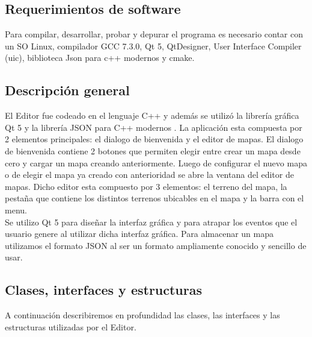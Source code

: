 \documentclass[titlepage,a4paper,12pt]{article}
\begin{document}
\subsection{Requerimientos de software}
Para compilar, desarrollar, probar y depurar el programa es necesario contar con un SO Linux, compilador GCC 7.3.0, Qt 5, QtDesigner, User Interface Compiler (uic), biblioteca Json para c++ modernos y cmake.

\subsection{Descripción general}

El Editor fue codeado en el lenguaje C++ y además se utilizó la librería gráfica Qt 5 y la librería JSON para C++ modernos . La aplicación esta compuesta por 2 elementos principales: el dialogo de bienvenida y el editor de mapas. El dialogo de bienvenida contiene 2 botones que permiten elegir entre crear un mapa desde cero y cargar un mapa creando anteriormente. Luego de configurar el nuevo mapa o de elegir el mapa ya creado con anterioridad se abre la ventana del editor de mapas. Dicho editor esta compuesto por 3 elementos: el terreno del mapa, la pestaña que contiene los distintos terrenos ubicables en el mapa y la barra con el menu.\\

Se utilizo Qt 5 para diseñar la interfaz gráfica y para atrapar los eventos que el usuario genere al utilizar dicha interfaz gráfica. Para almacenar un mapa utilizamos el formato JSON al ser un formato ampliamente conocido y sencillo de usar.

\subsection{Clases, interfaces y estructuras}

A continuación describiremos en profundidad las clases, las interfaces y las estructuras utilizadas por el Editor.
\end{document}
